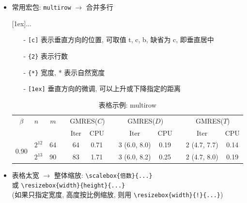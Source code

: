 \documentclass[openany]{MathematicalModelCaseStudyReport}  %
\numberwithin{algorithm}{chapter}
\begin{document}
\begin{itemize}
  \item 常用宏包: \Verb|multirow| $\to$ 合并多行
\begin{syntax}
  [1ex]{...}
\end{syntax}
\begin{itemize} \addtolength{\itemsep}{-0.5ex}
  \item[-] \Verb|[c]| 表示垂直方向的位置, 可取值 t, c, b, 缺省为 c, 即垂直居中

  \item[-] \Verb|{2}| 表示行数

  \item[-] \Verb|{*}| 宽度, * 表示自然宽度

  \item[-] \Verb|[1ex]| 垂直方向的微调, 可以上升或下降指定的距离
\end{itemize}

\begin{table}[H]
\begin{center}
\caption{表格示例: multirow \label{Tab:2}}
\begin{tabular}{clc*{3}{ccc}}\toprule
  $\beta$   & $n$ & $m$
  && \multicolumn{2}{c}{GMRES($C$)}
  && \multicolumn{2}{c}{GMRES($D$)}
  && \multicolumn{2}{c}{GMRES($T$)} \\ \cmidrule{1-3}\cmidrule{5-6}\cmidrule{8-9}\cmidrule{11-12}
  &         &    && Iter &  CPU && Iter         &  CPU   && Iter         & CPU      \\
  \cmidrule{1-3}\cmidrule{5-6}\cmidrule{8-9}\cmidrule{11-12}
  \multirow{2}{*}{0.90}
  &$2^{12}$ & 64 && 64 &   0.71 &&  3 (6.0, 8.0) &   0.19 &&  2 (4.7, 7.7) &   0.14 \\
  &$2^{13}$ & 90 && 83 &   1.71 &&  3 (6.0, 8.2) &   0.25 &&  2 (4.7, 8.0) &   0.19 \\
  \bottomrule
\end{tabular}
\end{center}
\end{table}

  \item 表格太宽 $\to$ 整体缩放: \Verb|\scalebox{倍数}{...}| \\
  或 \Verb|\resizebox{width}{height}{...}| \\
  (如果只指定宽度, 高度按比例缩放, 则用 \Verb|\resizebox{width}{!}{...}|)


\end{itemize}
\end{document}
